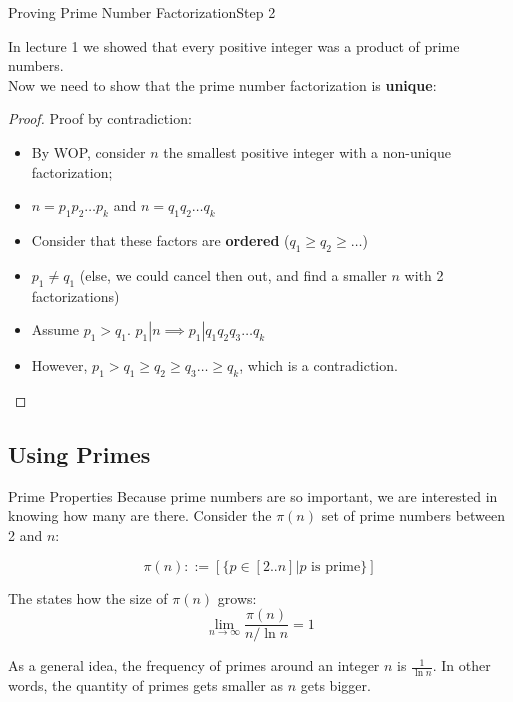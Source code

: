 \begin{frame}{Proving Prime Number Factorization}{Step 2}

  In lecture 1 we showed that every positive integer was a product of prime numbers.\\
  Now we need to show that the prime number factorization is {\bf unique}:

  \begin{proof}
    Proof by contradiction:
    \begin{itemize}
      \item By WOP, consider $n$ the smallest positive integer with a \alert{non-unique} factorization;
      \item $n = p_1p_2\ldots p_k$ and $n = q_1q_2\ldots q_k$
      \item Consider that these factors are {\bf ordered} ($q_1 \geq q_2 \geq \ldots$)
      \item $p_1 \neq q_1$ (else, we could cancel then out, and find a smaller $n$ with 2 factorizations)
      \item Assume $p_1 > q_1$. $p_1|n \implies p_1|q_1q_2q_3\ldots q_k$
      \item However, $p_1 > q_1 \geq q_2 \geq q_3 \ldots\geq q_k$, which is a contradiction.
    \end{itemize}

  \end{proof}
\end{frame}

\subsection{Using Primes}
\begin{frame}{Prime Properties}
  Because prime numbers are so important, we are interested in knowing how many are there. Consider the $\pi(n)$ set of prime numbers between 2 and $n$:

  \begin{equation*}
    \pi(n) ::= [\{p\in[2..n]|p\text{ is prime}\}]
  \end{equation*}
  \bigskip

  The  states how the size of $\pi(n)$ grows:
  \begin{equation*}
    \lim_{n\to\infty}\frac{\pi(n)}{n/\ln n} = 1
  \end{equation*}\bigskip

  As a general idea, the frequency of primes around an integer $n$ is $\frac{1}{\ln n}$. In other words, the quantity of primes gets smaller as $n$ gets bigger.
\end{frame}


